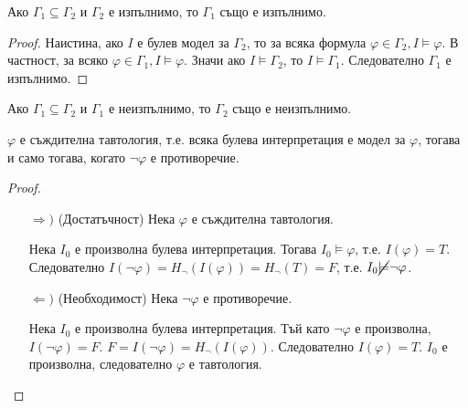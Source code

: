 \documentclass{article}
\def\Proofs{1}
\begin{document}
\begin{claim}
Ако $\Gamma_1 \subseteq \Gamma_2$ и $\Gamma_2$ е изпълнимо, то $\Gamma_1$ също е изпълнимо.


\ifcase\Proofs\or
\begin{proof}
Наистина, ако $I$ е булев модел за $\Gamma_2$, то за всяка формула $\varphi \in \Gamma_2, I \models \varphi$. В частност, за всяко $\varphi \in \Gamma_1, I \models \varphi$. Значи ако $I \models \Gamma_2$, то $I \models \Gamma_1$. Следователно $\Gamma_1$ е изпълнимо.
\end{proof}
\fi

\end{claim}

\begin{claim}
Ако $\Gamma_1 \subseteq \Gamma_2$ и $\Gamma_1$ е неизпълнимо, то $\Gamma_2$ също е неизпълнимо.
\end{claim}

\begin{claim}
$\varphi$ е съждителна тавтология, т.е. всяка булева интерпретация е модел за $\varphi$, тогава и само тогава, когато $\neg\varphi$ е противоречие.


\ifcase\Proofs\or
\begin{proof}
$\ $
\begin{itemize}
\item[$\Rightarrow)$](Достатъчност) Нека $\varphi$ е съждителна тавтология. 

Нека $I_0$ е произволна булева интерпретация. Тогава $I_0 \models \varphi$, т.е. $I(\varphi) = T$. Следователно $I(\neg\varphi) = H_\neg(I(\varphi)) = H_\neg(T) = F$, т.е. $I_0 \cancel{\models} \neg\varphi$.
\item[$\Leftarrow)$](Необходимост) Нека $\neg\varphi$ е противоречие.

Нека $I_0$ е произволна булева интерпретация. Тъй като $\neg\varphi$ е произволна, $I(\neg\varphi) = F$. $F = I(\neg\varphi) = H_\neg(I(\varphi))$. Следователно $I(\varphi) = T$. $I_0$ е произволна, следователно $\varphi$ е тавтология.
\end{itemize}
\end{proof}
\fi
\end{claim}
\end{document}
